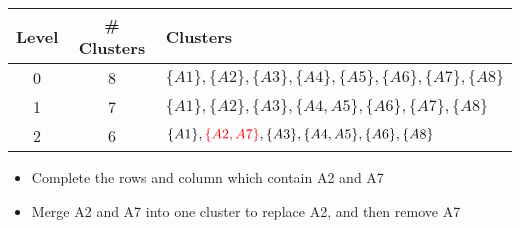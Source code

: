 \documentclass[aspectratio=169, 10pt]{beamer}
\begin{document}
\begin{frame}[t]
    \begin{table}[]
        \scriptsize
        \begin{tabular}{c|c|l}
        Level & \# Clusters & Clusters \\ \hline
        0     & 8           & $\{A1\}, \{A2\}, \{A3\}, \{A4\}, \{A5\}, \{A6\}, \{A7\}, \{A8\}$\\
        1     & 7           & $\{A1\}, \{A2\}, \{A3\}, \{A4, A5\}, \{A6\}, \{A7\}, \{A8\}$\\
        2     & 6           & $\{A1\}, \textcolor{red}{\{A2, A7\}}, \{A3\}, \{A4, A5\}, \{A6\}, \{A8\}$\\
        \end{tabular}
    \end{table}

    \begin{itemize}
        \item Complete the rows and column which contain A2 and A7
        \item Merge A2 and A7 into one cluster to replace A2, and then remove A7
    \end{itemize}

\end{frame}
\end{document}
